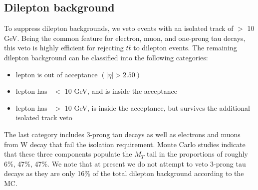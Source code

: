 \subsection{Dilepton background}
\label{sec:dil-general}

To suppress dilepton backgrounds, we veto events with an isolated track of \pt $>$ 10 GeV. 
Being the common feature for electron, muon, and one-prong
tau decays, this veto is highly efficient for rejecting 
$t\bar{t}$ to dilepton events. The remaining dilepton background can be classified into the following categories:

\begin{itemize}
\item lepton is out of acceptance $(|\eta| > 2.50)$
\item lepton has \pt\ $<$ 10 GeV, and is inside the acceptance
\item lepton has \pt\ $>$ 10 GeV, is inside the acceptance, but survives the additional isolated track veto
\end{itemize}


The last category includes 3-prong tau decays as well as electrons and muons from W decay that fail the isolation requirement.
Monte Carlo studies indicate that these three components populate the $M_T$ tail in the proportions of roughly  6\%, 47\%, 47\%. 
We note that at present we do not attempt to veto 3-prong tau decays as they are only 16\% of the total dilepton background according to the MC.

